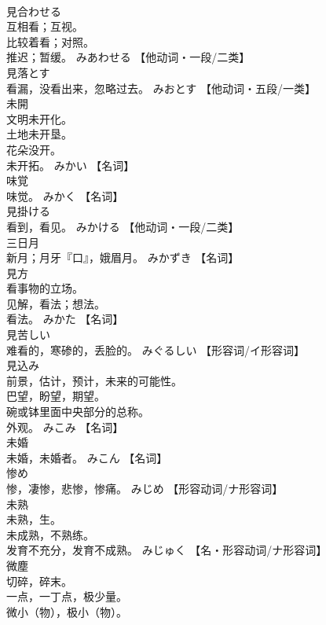 \documentclass[8pt]{extreport}
\begin{document}
\begin{CJK}{UTF8}{min}
\\	見合わせる	
\\	互相看；互视。 
\\	比较着看；对照。 
\\	推迟；暂缓。	みあわせる		【他动词・一段/二类】
\\	見落とす	
\\	看漏，没看出来，忽略过去。	みおとす		【他动词・五段/一类】
\\	未開	
\\	文明未开化。 
\\	土地未开垦。 
\\	花朵没开。 
\\	未开拓。	みかい		【名词】
\\	味覚	
\\	味觉。	みかく		【名词】
\\	見掛ける	
\\	看到，看见。	みかける		【他动词・一段/二类】
\\	三日月	
\\	新月；月牙『口』，娥眉月。	みかずき		【名词】
\\	見方	
\\	看事物的立场。 
\\	见解，看法；想法。 
\\	看法。	みかた		【名词】
\\	見苦しい	
\\	难看的，寒碜的，丢脸的。	みぐるしい		【形容词/イ形容词】
\\	見込み	
\\	前景，估计，预计，未来的可能性。 
\\	巴望，盼望，期望。 
\\	碗或钵里面中央部分的总称。 
\\	外观。	みこみ		【名词】
\\	未婚	
\\	未婚，未婚者。	みこん		【名词】
\\	惨め	
\\	惨，凄惨，悲惨，惨痛。	みじめ		【形容动词/ナ形容词】
\\	未熟	
\\	未熟，生。 
\\	未成熟，不熟练。 
\\	发育不充分，发育不成熟。	みじゅく		【名・形容动词/ナ形容词】
\\	微塵	
\\	切碎，碎末。 
\\	一点，一丁点，极少量。 
\\	微小（物），极小（物）。 

\end{CJK}
\end{document}
